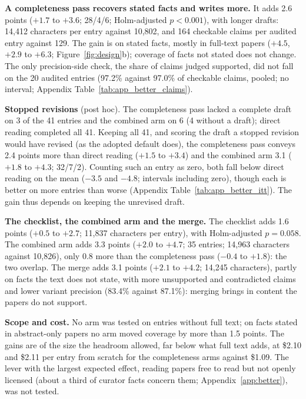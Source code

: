 \documentclass{article} %
\begin{document}
\textbf{A completeness pass recovers stated facts and writes more.} It adds 2.6 points ($+1.7$ to $+3.6$; 28/4/6; Holm-adjusted $p<0.001$), with longer drafts: 14,412 characters per entry against 10,802, and 164 checkable claims per audited entry against 129. The gain is on stated facts, mostly in full-text papers ($+4.5$, $+2.9$ to $+6.3$; Figure~\ref{fig:design}b); coverage of facts not stated does not change. The only precision-side check, the share of claims judged supported, did not fall on the 20 audited entries (97.2\% against 97.0\% of checkable claims, pooled; no interval; Appendix Table~\ref{tab:app_better_claims}).

\textbf{Stopped revisions} (post hoc). The completeness pass lacked a complete draft on 3 of the 41 entries and the combined arm on 6 (4 without a draft); direct reading completed all 41. Keeping all 41, and scoring the draft a stopped revision would have revised (as the adopted default does), the completeness pass conveys 2.4 points more than direct reading ($+1.5$ to $+3.4$) and the combined arm 3.1 ($+1.8$ to $+4.3$; 32/7/2). Counting such an entry as zero, both fall below direct reading on the mean ($-3.5$ and $-4.8$; intervals including zero), though each is better on more entries than worse (Appendix Table~\ref{tab:app_better_itt}). The gain thus depends on keeping the unrevised draft.

\textbf{The checklist, the combined arm and the merge.} The checklist adds 1.6 points ($+0.5$ to $+2.7$; 11,837 characters per entry), with Holm-adjusted $p=0.058$. The combined arm adds 3.3 points ($+2.0$ to $+4.7$; 35 entries; 14,963 characters against 10,826), only 0.8 more than the completeness pass ($-0.4$ to $+1.8$): the two overlap. The merge adds 3.1 points ($+2.1$ to $+4.2$; 14,245 characters), partly on facts the text does not state, with more unsupported and contradicted claims and lower variant precision (83.4\% against 87.1\%): merging brings in content the papers do not support.

\textbf{Scope and cost.} No arm was tested on entries without full text; on facts stated in abstract-only papers no arm moved coverage by more than 1.5 points. The gains are of the size the headroom allowed, far below what full text adds, at \$2.10 and \$2.11 per entry from scratch for the completeness arms against \$1.09. The lever with the largest expected effect, reading papers free to read but not openly licensed (about a third of curator facts concern them; Appendix~\ref{app:better}), was not tested.
\end{document}
